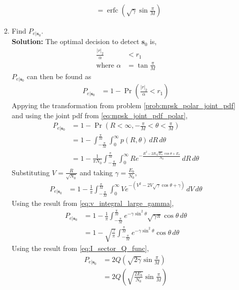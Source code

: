 \documentclass[journal,8pt,onecolumn]{IEEEtran}
\providecommand{\pr}[1]{\ensuremath{\Pr\left(#1\right)}}
\providecommand{\qfunc}[1]{\ensuremath{Q\left(#1\right)}}
\providecommand{\brak}[1]{\ensuremath{\left(#1\right)}}
\providecommand{\abs}[1]{\left\vert#1\right\vert}
\newcommand{\solution}{\noindent \textbf{Solution: }}
\let\vec\mathbf
\begin{document}
\begin{enumerate}
\begin{enumerate}[label=(\alph{enumii})]
\begin{align}
	&= \operatorname{erfc}\left(\sqrt{\gamma}\sin \frac{\pi}{M}\right)
\end{align}
\item Find $P_{e|\mathbf{s}_0}$.\\
\solution The optimal decision to detect $\vec{s}_0$ is,
\begin{align}
	\frac{\abs{r}_2}{\alpha} &< r_1\\
	\nonumber
	\text{where } \alpha &= \tan \frac{\pi}{M} 
\end{align}
$P_{e|\mathbf{s}_0}$ can then be found as 
\begin{align}
	P_{e|\mathbf{s}_0} &= 1 - \pr{\frac{\abs{r}_2}{\alpha} < r_1}
\end{align}
Appying the transformation from problem \ref{prob:mpsk_polar_joint_pdf} and using the joint pdf from \eqref{eq:mpsk_joint_pdf_polar},
\begin{align*}
	P_{e|\mathbf{s}_0} &= 1 - \pr{R < \infty, -\frac{\pi}{M} < \theta < \frac{\pi}{M}}\\
	&= 1 - \int_{-\frac{\pi}{M}}^{\frac{\pi}{M}} \int_{0}^{\infty} p\brak{R,\theta} \,dR  \,d\theta\\ 
	&= 1 - \frac{1}{\pi N_0} \int_{-\frac{\pi}{M}}^{\frac{\pi}{M}} \int_{0}^{\infty} Re^{-\frac{R^2-2R\sqrt{E_s}\cos \theta + E_s}{N_0}} \,dR  \,d\theta
\end{align*}
Substituting $V = \frac{R}{\sqrt{N_0}}$ and taking $\gamma = \frac{E_b}{N_0}$,
\begin{align*}
	P_{e|\mathbf{s}_0} &= 1 - \frac{1}{\pi} \int_{-\frac{\pi}{M}}^{\frac{\pi}{M}} \int_{0}^{\infty} Ve^{-\brak{V^2-2V\sqrt{\gamma}\cos \theta + \gamma}} \,dV  \,d\theta
\end{align*}
Using the result from \eqref{eq:v_integral_large_gamma},
\begin{align*}
	P_{e|\mathbf{s}_0} &= 1 - \frac{1}{\pi} \int_{-\frac{\pi}{M}}^{\frac{\pi}{M}}  e^{-\gamma\sin^2 \theta}\sqrt{\gamma\pi}\cos \theta \,d\theta\\
	&= 1 - \sqrt{\frac{\gamma}{\pi}} \int_{-\frac{\pi}{M}}^{\frac{\pi}{M}}  e^{-\gamma\sin^2 \theta}\cos \theta \,d\theta
\end{align*}
Using the result from \eqref{eq:I_sector_Q_func},
\begin{align}	
	P_{e|\mathbf{s}_0} &= 2\qfunc{\sqrt{2\gamma}\sin \frac{\pi}{M}}\\
	&= 2\qfunc{\sqrt{\frac{2E_b}{N_0}}\sin \frac{\pi}{M}}
\end{align}

\end{enumerate}
\end{enumerate}
\end{document}
